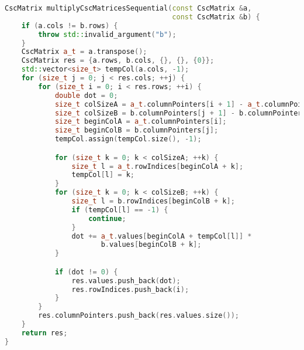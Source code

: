 \documentclass[a4paper,12pt]{article}
\begin{document}
\begin{lstlisting}[language=C++]
CscMatrix multiplyCscMatricesSequential(const CscMatrix &a,
                                        const CscMatrix &b) {
    if (a.cols != b.rows) {
        throw std::invalid_argument("b");
    }
    CscMatrix a_t = a.transpose();
    CscMatrix res = {a.rows, b.cols, {}, {}, {0}};
    std::vector<size_t> tempCol(a.cols, -1);
    for (size_t j = 0; j < res.cols; ++j) {
        for (size_t i = 0; i < res.rows; ++i) {
            double dot = 0;
            size_t colSizeA = a_t.columnPointers[i + 1] - a_t.columnPointers[i];
            size_t colSizeB = b.columnPointers[j + 1] - b.columnPointers[j];
            size_t beginColA = a_t.columnPointers[i];
            size_t beginColB = b.columnPointers[j];
            tempCol.assign(tempCol.size(), -1);

            for (size_t k = 0; k < colSizeA; ++k) {
                size_t l = a_t.rowIndices[beginColA + k];
                tempCol[l] = k;
            }
            for (size_t k = 0; k < colSizeB; ++k) {
                size_t l = b.rowIndices[beginColB + k];
                if (tempCol[l] == -1) {
                    continue;
                }
                dot += a_t.values[beginColA + tempCol[l]] *
                       b.values[beginColB + k];
            }

            if (dot != 0) {
                res.values.push_back(dot);
                res.rowIndices.push_back(i);
            }
        }
        res.columnPointers.push_back(res.values.size());
    }
    return res;
}

\end{lstlisting}
\end{document}
